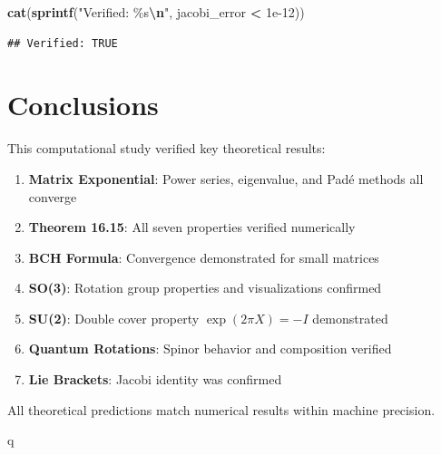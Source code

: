 \documentclass[
]{book}
\newenvironment{Shaded}{\begin{snugshade}}{\end{snugshade}}
\newcommand{\FloatTok}[1]{\textcolor[rgb]{0.00,0.00,0.81}{#1}}
\newcommand{\FunctionTok}[1]{\textcolor[rgb]{0.13,0.29,0.53}{\textbf{#1}}}
\newcommand{\NormalTok}[1]{#1}
\newcommand{\SpecialCharTok}[1]{\textcolor[rgb]{0.81,0.36,0.00}{\textbf{#1}}}
\newcommand{\StringTok}[1]{\textcolor[rgb]{0.31,0.60,0.02}{#1}}
\providecommand{\tightlist}{%
  \setlength{\itemsep}{0pt}\setlength{\parskip}{0pt}}
\theoremstyle{definition}
\theoremstyle{definition}
\theoremstyle{definition}
\theoremstyle{definition}
\theoremstyle{remark}
\begin{document}
\begin{Shaded}
\begin{Highlighting}[]
\FunctionTok{cat}\NormalTok{(}\FunctionTok{sprintf}\NormalTok{(}\StringTok{"Verified: \%s}\SpecialCharTok{\textbackslash{}n}\StringTok{"}\NormalTok{, jacobi\_error }\SpecialCharTok{\textless{}} \FloatTok{1e{-}12}\NormalTok{))}
\end{Highlighting}
\end{Shaded}

\begin{verbatim}
## Verified: TRUE
\end{verbatim}

\section{Conclusions}\label{conclusions}

This computational study verified key theoretical results:

\begin{enumerate}
\def\labelenumi{\arabic{enumi}.}
\tightlist
\item
  \textbf{Matrix Exponential}: Power series, eigenvalue, and Padé methods all converge
\item
  \textbf{Theorem 16.15}: All seven properties verified numerically
\item
  \textbf{BCH Formula}: Convergence demonstrated for small matrices
\item
  \textbf{SO(3)}: Rotation group properties and visualizations confirmed
\item
  \textbf{SU(2)}: Double cover property \(\exp(2\pi X) = -I\) demonstrated
\item
  \textbf{Quantum Rotations}: Spinor behavior and composition verified
\item
  \textbf{Lie Brackets}: Jacobi identity was confirmed
\end{enumerate}

All theoretical predictions match numerical results within machine precision.

q


\end{document}
